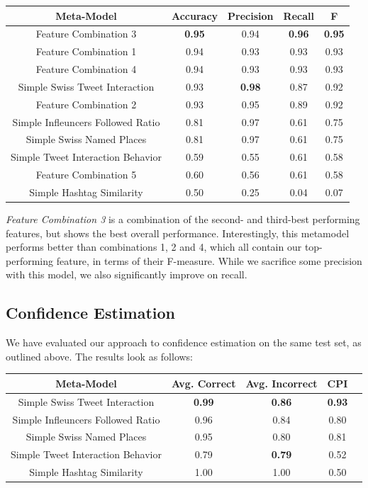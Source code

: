 \documentclass[10pt,a4paper]{article}
\begin{document}
\begin{center}
\begin{tabular}{ |c|c|c|c|c| }
\hline
\textbf{Meta-Model} & \textbf{Accuracy} & \textbf{Precision} & \textbf{Recall} & \textbf{F} \\
\hline
Feature Combination 3 & \textbf{0.95} & 0.94 & \textbf{0.96} & \textbf{0.95} \\
\hline
Feature Combination 1 & 0.94 & 0.93 & 0.93 & 0.93 \\
\hline
Feature Combination 4 & 0.94 & 0.93 & 0.93 & 0.93 \\
\hline
Simple Swiss Tweet Interaction & 0.93 & \textbf{0.98} & 0.87 & 0.92 \\
\hline
Feature Combination 2 & 0.93 & 0.95 & 0.89 & 0.92 \\
\hline
Simple Infleuncers Followed Ratio & 0.81 & 0.97 & 0.61 & 0.75 \\
\hline
Simple Swiss Named Places & 0.81 & 0.97 & 0.61 & 0.75 \\
\hline
Simple Tweet Interaction Behavior & 0.59 & 0.55 & 0.61 & 0.58 \\
\hline
Feature Combination 5 & 0.60 & 0.56 & 0.61 & 0.58 \\
\hline
Simple Hashtag Similarity & 0.50 & 0.25 & 0.04 & 0.07 \\
\hline
\end{tabular}
\end{center}

\textit{Feature Combination 3} is a combination of the second- and third-best performing features, but shows the best overall performance. Interestingly, this metamodel performs better than combinations 1, 2 and 4, which all contain our top-performing feature, in terms of their F-measure. While we sacrifice some precision with this model, we also significantly improve on recall.

\subsection{Confidence Estimation}
We have evaluated our approach to confidence estimation on the same test set, as outlined above. The results look as follows:

\begin{center}
\begin{tabular}{ |c|c|c|c|c| }
\hline
\textbf{Meta-Model} & \textbf{Avg. Correct} & \textbf{Avg. Incorrect} & \textbf{CPI} \\
\hline
Simple Swiss Tweet Interaction & \textbf{0.99} & \textbf{0.86} & \textbf{0.93} \\
\hline
Simple Infleuncers Followed Ratio & 0.96 & 0.84 & 0.80 \\
\hline
Simple Swiss Named Places & 0.95 & 0.80 & 0.81 \\
\hline
\hline
Simple Tweet Interaction Behavior & 0.79 & \textbf{0.79} & 0.52 \\
\hline
Simple Hashtag Similarity & 1.00 & 1.00 & 0.50 \\
\hline
\end{tabular}
\end{center}
\end{document}
